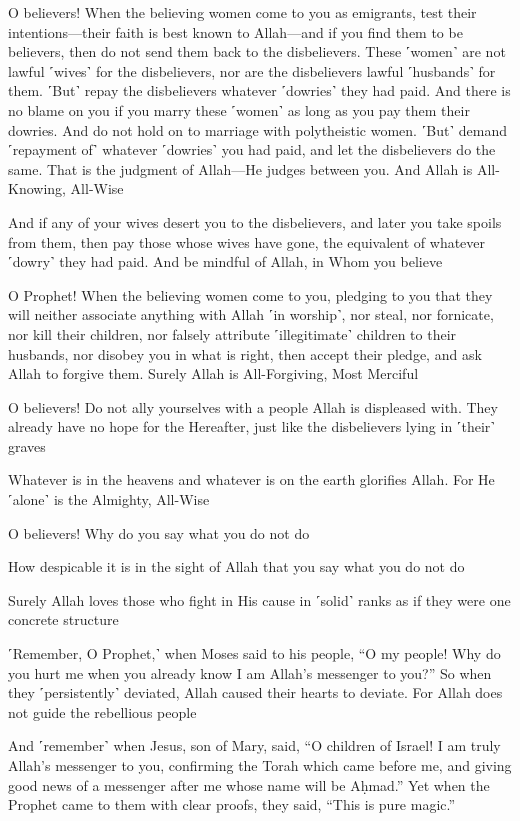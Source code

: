 O believers! When the believing women come to you as emigrants, test their intentions—their faith is best known to Allah—and if you find them to be believers, then do not send them back to the disbelievers. These ˹women˺ are not lawful ˹wives˺ for the disbelievers, nor are the disbelievers lawful ˹husbands˺ for them. ˹But˺ repay the disbelievers whatever ˹dowries˺ they had paid. And there is no blame on you if you marry these ˹women˺ as long as you pay them their dowries. And do not hold on to marriage with polytheistic women. ˹But˺ demand ˹repayment of˺ whatever ˹dowries˺ you had paid, and let the disbelievers do the same. That is the judgment of Allah—He judges between you. And Allah is All-Knowing, All-Wise

And if any of your wives desert you to the disbelievers, and later you take spoils from them, then pay those whose wives have gone, the equivalent of whatever ˹dowry˺ they had paid. And be mindful of Allah, in Whom you believe

O Prophet! When the believing women come to you, pledging to you that they will neither associate anything with Allah ˹in worship˺, nor steal, nor fornicate, nor kill their children, nor falsely attribute ˹illegitimate˺ children to their husbands, nor disobey you in what is right, then accept their pledge, and ask Allah to forgive them. Surely Allah is All-Forgiving, Most Merciful

O believers! Do not ally yourselves with a people Allah is displeased with. They already have no hope for the Hereafter, just like the disbelievers lying in ˹their˺ graves

Whatever is in the heavens and whatever is on the earth glorifies Allah. For He ˹alone˺ is the Almighty, All-Wise

O believers! Why do you say what you do not do

How despicable it is in the sight of Allah that you say what you do not do

Surely Allah loves those who fight in His cause in ˹solid˺ ranks as if they were one concrete structure

˹Remember, O Prophet,˺ when Moses said to his people, “O my people! Why do you hurt me when you already know I am Allah’s messenger to you?” So when they ˹persistently˺ deviated, Allah caused their hearts to deviate. For Allah does not guide the rebellious people

And ˹remember˺ when Jesus, son of Mary, said, “O children of Israel! I am truly Allah’s messenger to you, confirming the Torah which came before me, and giving good news of a messenger after me whose name will be Aḥmad.” Yet when the Prophet came to them with clear proofs, they said, “This is pure magic.”

